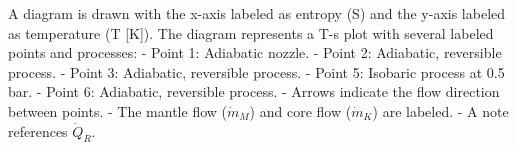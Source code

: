 A diagram is drawn with the x-axis labeled as entropy (S) and the y-axis labeled as temperature (T [K]). The diagram represents a T-s plot with several labeled points and processes:  
- Point 1: Adiabatic nozzle.  
- Point 2: Adiabatic, reversible process.  
- Point 3: Adiabatic, reversible process.  
- Point 5: Isobaric process at 0.5 bar.  
- Point 6: Adiabatic, reversible process.  
- Arrows indicate the flow direction between points.  
- The mantle flow (\( \dot{m}_M \)) and core flow (\( \dot{m}_K \)) are labeled.  
- A note references \( \dot{Q}_R \).